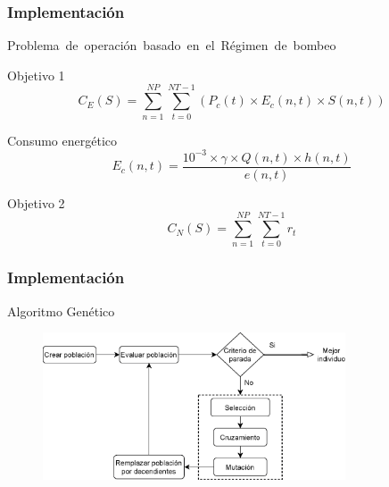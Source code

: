 \documentclass[9pt]{beamer}
\begin{document}
    \begin{frame}
        \frametitle{Implementación}                       
        Problema de operación basado en el Régimen de bombeo
        
        \begin{block}{Objetivo 1}
            \begin{equation*}
                C_E(S) = \sum_{n=1}^{NP}\sum_{t=0}^{NT-1}(P_c(t) \times E_c(n, t) \times S(n, t))
            \end{equation*}
        \end{block}

        \begin{block}{Consumo energético}
            \begin{equation*}
                E_c(n, t) = \frac{10^{-3} \times \gamma \times Q(n, t) \times h(n, t)}{e(n, t)}
            \end{equation*}
        \end{block}
        
        \begin{block}{Objetivo 2}
            \begin{equation*}
                C_N(S) = \sum_{n=1}^{NP}\sum_{t=0}^{NT-1}r_t
            \end{equation*}
        \end{block}
    \end{frame}

    \begin{frame}
        \frametitle{Implementación}                       
        Algoritmo Genético

        \begin{figure}
            \includegraphics[width=0.8\textwidth]{assets/AlgoritmoGenetico.eps}
        \end{figure}

    \end{frame}

\end{document}
